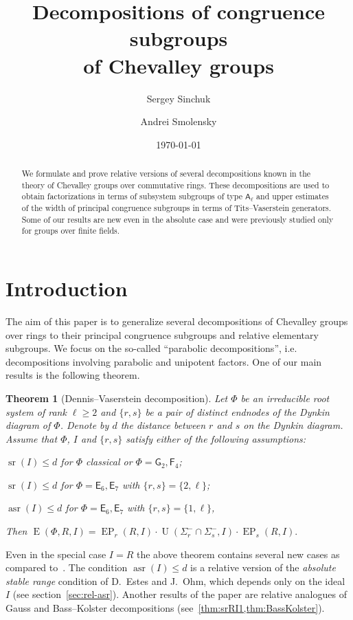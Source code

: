 \documentclass[11pt]{amsart}
\title[Decompositions of congruence subgroups of Chevalley groups]{Decompositions of congruence subgroups \\ of Chevalley groups}
\author{Sergey Sinchuk}
\author{Andrei Smolensky}
\date {\today}
\theoremstyle{plain}
\newtheorem{thm}{Theorem}
\numberwithin{equation}{section}
\numberwithin{lemma}{section}
\theoremstyle{definition}
\theoremstyle{remark}
\DeclareMathOperator{\E}{E}
\DeclareMathOperator{\EP}{EP}
\DeclareMathOperator{\U}{U}
\DeclareMathOperator{\sr}{sr}
\DeclareMathOperator{\asr}{asr}
\newcommand{\rA}{\mathsf{A}}
\newcommand{\rE}{\mathsf{E}}
\newcommand{\rF}{\mathsf{F}}
\newcommand{\rG}{\mathsf{G}}
\begin{document}
\begin{abstract} 
We formulate and prove relative versions of several decompositions known in the theory of Chevalley groups over commutative rings.
These decompositions are used to obtain factorizations in terms of subsystem subgroups of type $\rA_\ell$ and 
 upper estimates of the width of principal congruence subgroups in terms of Tits--Vaserstein generators.
Some of our results are new even in the absolute case and were previously studied only for groups over finite fields.
\end{abstract}

\maketitle

\section{Introduction}\label{sec:intro}
The aim of this paper is to generalize several decompositions of Chevalley groups over rings 
 to their principal congruence subgroups and relative elementary subgroups.
We focus on the so-called ``parabolic decompositions'', i.e. decompositions involving parabolic and unipotent factors. 
One of our main results is the following theorem.
\begin{thm}[Dennis--Vaserstein decomposition]\label{thm:DennisVaserstein}
Let $\Phi$ be an irreducible root system of rank $\ell\geqslant 2$ and $\{ r, s \}$ be a pair of distinct endnodes of the Dynkin diagram of $\Phi$.
Denote by $d$ the distance between $r$ and $s$ on the Dynkin diagram.
Assume that $\Phi$, $I$ and $\{r, s\}$ satisfy either of the following assumptions:
\begin{thmlist}
 \item $\sr(I) \leqslant d$ for $\Phi$ classical or $\Phi=\rG_2, \rF_4$;
 \item $\sr(I) \leqslant d$ for $\Phi=\rE_6,\rE_7$ with $\{r, s\} = \{2, \ell\}$;
 \item $\asr(I) \leqslant d$ for $\Phi=\rE_6,\rE_7$ with $\{r, s\} = \{1, \ell \}$, 
\end{thmlist}
Then $\E(\Phi, R, I) = \EP_r(R, I) \cdot \U(\Sigma^-_r \cap \Sigma^-_s, I) \cdot \EP_s(R, I).$
\end{thm}
Even in the special case $I=R$ the above theorem contains several new cases as compared to~\cite[Theorems~2.5 and~4.1]{St78}.
The condition $\asr(I) \leq d$ is a relative version of the \emph{absolute stable range} condition of D.~Estes and J.~Ohm, which depends only on the ideal $I$ (see section~\ref{sec:rel-asr}).
Another results of the paper are relative analogues of Gauss and Bass--Kolster decompositions (see~\cref{thm:srRI1,thm:BassKolster}).
\end{document}
